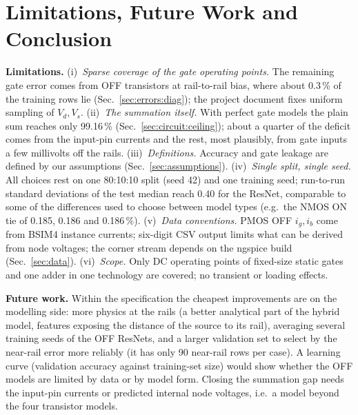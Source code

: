 \section{Limitations, Future Work and Conclusion}\label{sec:limits}
\textbf{Limitations.}
(i)~\emph{Sparse coverage of the gate operating points.} The remaining gate error comes from OFF transistors at rail-to-rail bias, where about 0.3\,\% of the training rows lie (Sec.~\ref{sec:errors:diag}); the project document fixes uniform sampling of $V_d,V_s$.
(ii)~\emph{The summation itself.} With perfect gate models the plain sum reaches only 99.16\,\% (Sec.~\ref{sec:circuit:ceiling}); about a quarter of the deficit comes from the input-pin currents and the rest, most plausibly, from gate inputs a few millivolts off the rails.
(iii)~\emph{Definitions.} Accuracy and gate leakage are defined by our assumptions (Sec.~\ref{sec:assumptions}).
(iv)~\emph{Single split, single seed.} All choices rest on one 80:10:10 split (seed 42) and one training seed; run-to-run standard deviations of the test median reach 0.40 for the ResNet, comparable to some of the differences used to choose between model types (e.g.\ the NMOS ON tie of 0.185, 0.186 and 0.186\,\%).
(v)~\emph{Data conventions.} PMOS OFF $i_g,i_b$ come from BSIM4 instance currents; six-digit CSV output limits what can be derived from node voltages; the corner stream depends on the ngspice build (Sec.~\ref{sec:data}).
(vi)~\emph{Scope.} Only DC operating points of fixed-size static gates and one adder in one technology are covered; no transient or loading effects.

\textbf{Future work.} Within the specification the cheapest improvements are on the modelling side: more physics at the rails (a better analytical part of the hybrid model, features exposing the distance of the source to its rail), averaging several training seeds of the OFF ResNets, and a larger validation set to select by the near-rail error more reliably (it has only 90 near-rail rows per case). A learning curve (validation accuracy against training-set size) would show whether the OFF models are limited by data or by model form. Closing the summation gap needs the input-pin currents or predicted internal node voltages, i.e.\ a model beyond the four transistor models.

